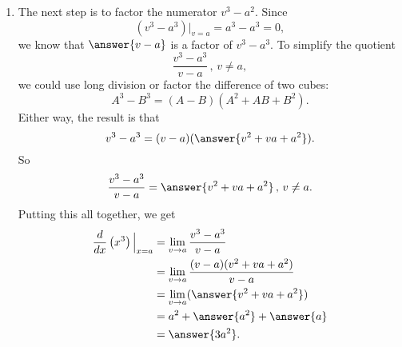 \documentclass{ximera}
\begin{document}
\begin{exploration}
\begin{enumerate}
\item The next step is to factor the numerator $v^3-a^2$. Since 
\[
     (v^3 - a^3)\Big|_{v=a} = a^3 - a^3 = 0 ,
\]
we know that $\answer{v-a}$ is a factor of $v^3-a^3$. To simplify the quotient
\[
  \frac{v^3-a^3}{v-a} \, , \, v\neq a,
\]
we could use long division or factor the difference of two cubes:
\[
   A^3 - B^3 = (A-B)(A^2 + AB + B^2).
\]
Either way, the result is that
\[
     v^3 - a^3 = (v-a)(\answer{v^2 + va + a^2}).
\]
So
\[
   \frac{v^3-a^3}{v-a} = \answer{v^2+va+a^2} \, , \, v\neq a.
\]
Putting this all together, we get
\begin{align*}
\frac{d}{dx}\left( x^3 \right)\Big|_{x=a}  & = \lim_{v\to a} \frac{v^3-a^3}{v-a} \\
                                                              &= \lim_{v\to a} \frac{(v-a)(v^2+va+a^2)}{v-a} \\
                                                             & = \lim_{v\to a}(\answer{v^2 + va + a^2}) \\
                                                            & = a^2 + \answer{a^2} + \answer{a} \\
                                                            & = \answer{3a^2} .
\end{align*}
\end{enumerate}

\
\end{exploration}
\end{document}
